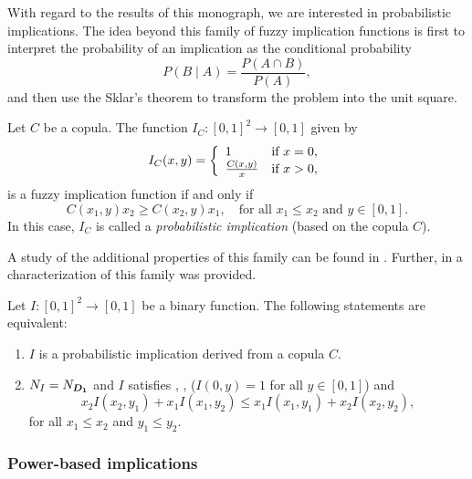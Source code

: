 With regard to the results of this monograph, we are interested in probabilistic implications. The idea beyond this family of fuzzy implication functions is first to interpret the probability of an implication as the conditional probability
$$ P(B \mid A) = \frac{P(A \cap B)}{P(A)},$$
and then use the Sklar's theorem to transform the problem into the unit square.

\begin{proposition} Let $C$ be a copula. The function $I_C: [0,1]^2 \to [0,1]$ given by
$$I_C(x,y)
=
\left \{\begin{array}{ll} 
	1& \hbox{if } x=0,\\
	\frac{C(x,y)}{x} &\hbox{if } x>0,
\end{array}\right.
$$
is a fuzzy implication function if and only if
$$C(x_1,y)x_2 \geq C(x_2,y)x_1, \quad \text{for all } x_1 \leq x_2 \text{ and } y \in [0,1].$$
In this case, $I_C$ is called a \emph{probabilistic implication} (based on the copula $C$).
\end{proposition}

A study of the additional properties of this family can be found in \cite{Grzegorzewski2011,Grzegorzewski2013,Baczynski2016}. Further, in \cite{Massanet2019D} a characterization of this family was provided.

\begin{theorem}
	Let $I: [0,1]^2 \to [0,1]$ be a binary function. The following statements are equivalent:
	\begin{enumerate}[label=(\roman*)]
		\item $I$ is a probabilistic implication derived from a copula $C$.
		\item $N_I=N_{\bm{D_1}}$ and $I$ satisfies \Ione, \NP, ($I(0,y)=1$ for all $y \in [0,1]$) and
		$$x_2I(x_2,y_1)+x_1I(x_1,y_2) \leq x_1I(x_1,y_1)+x_2I(x_2,y_2),$$
		for all $x_1 \leq x_2$ and $y_1 \leq y_2$.
	\end{enumerate}
\end{theorem}



\subsubsection{Power-based implications}

